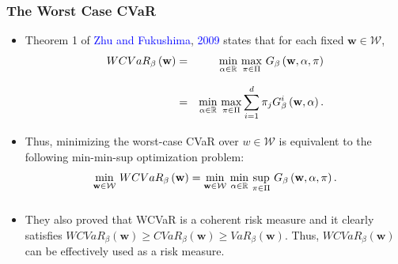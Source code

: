 \documentclass[pdf,9pt,xcolor=dvipsnames,hide notes]{beamer}
\begin{document}
\begin{frame}[label=frame2f]
	\frametitle{The Worst Case CVaR}
	
	\begin{itemize}
		\justifying
		
		\item Theorem 1 of 	\textcolor{blue}{Zhu and Fukushima}, \textcolor{blue}{2009} states that for each fixed $%
		\mathbf{w}\in \mathcal{W}$,
		\begin{eqnarray}
		WCVaR_{\beta }\left( \mathbf{w}\right) &=&\underset{}{\underset{\alpha \in
				\mathbb{R}
			}{\min }~\underset{\pi \in \Pi }{\max }}~G_{\beta }\left( \mathbf{w},\alpha
		,\pi \right)  \notag \\
		&=&\underset{}{\underset{\alpha \in
				\mathbb{R}
			}{\min }~\underset{\pi \in \Pi }{\max }}\sum_{i=1}^{d}\pi _{j}G_{\beta
		}^{i}\left( \mathbf{w},\alpha \right) .  \label{18}
		\end{eqnarray}%
		
	\vspace{0.3cm}
		
	\item Thus, minimizing the worst-case CVaR over $w\in \mathcal{W}$ is equivalent
		to the following min-min-sup optimization problem:
		\begin{equation}
		\underset{}{\underset{\mathbf{w}\in \mathcal{W}}{\min }}~WCVaR_{\beta
		}\left( \mathbf{w}\right) =\underset{}{\underset{\mathbf{w}\in \mathcal{W}}{%
				\min }~\underset{\alpha \in
				\mathbb{R}
			}{\min }~\underset{\pi \in \Pi }{\sup }}~G_{\beta }\left( \mathbf{w},\alpha
		,\pi \right) .  \label{19}
		\end{equation}%
		
		\vspace{0.3cm}
		
		
		\item They also proved that WCVaR is a coherent risk measure and
		it clearly satisfies $WCVaR_{\beta }\left( \mathbf{w}\right) \geq
		CVaR_{\beta }\left( \mathbf{w}\right) \geq VaR_{\beta }\left( \mathbf{w}%
		\right) $. Thus, $WCVaR_{\beta }\left( \mathbf{w}\right) $ can be
		effectively used as a risk measure.
		
	\end{itemize}
	
	\end{frame}
\end{document}

